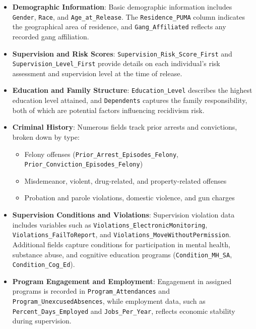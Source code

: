 \documentclass[12pt]{article}
\begin{document}
\begin{itemize}
    \item \textbf{Demographic Information}: Basic demographic information includes \texttt{Gender}, \texttt{Race}, and \texttt{Age\_at\_Release}. The \texttt{Residence\_PUMA} column indicates the geographical area of residence, and \texttt{Gang\_Affiliated} reflects any recorded gang affiliation.
    
    \item \textbf{Supervision and Risk Scores}: \texttt{Supervision\_Risk\_Score\_First} and \texttt{Supervision\_Level\_First} provide details on each individual’s risk assessment and supervision level at the time of release.
    
    \item \textbf{Education and Family Structure}: \texttt{Education\_Level} describes the highest education level attained, and \texttt{Dependents} captures the family responsibility, both of which are potential factors influencing recidivism risk.
    
    \item \textbf{Criminal History}: Numerous fields track prior arrests and convictions, broken down by type:
    \begin{itemize}
        \item Felony offenses (\texttt{Prior\_Arrest\_Episodes\_Felony}, \texttt{Prior\_Conviction\_Episodes\_Felony})
        \item Misdemeanor, violent, drug-related, and property-related offenses
        \item Probation and parole violations, domestic violence, and gun charges
    \end{itemize}
    
    \item \textbf{Supervision Conditions and Violations}: Supervision violation data includes variables such as \texttt{Violations\_ElectronicMonitoring}, \texttt{Violations\_FailToReport}, and \texttt{Violations\_MoveWithoutPermission}. Additional fields capture conditions for participation in mental health, substance abuse, and cognitive education programs (\texttt{Condition\_MH\_SA}, \texttt{Condition\_Cog\_Ed}).
    
    \item \textbf{Program Engagement and Employment}: Engagement in assigned programs is recorded in \texttt{Program\_Attendances} and \texttt{Program\_UnexcusedAbsences}, while employment data, such as \texttt{Percent\_Days\_Employed} and \texttt{Jobs\_Per\_Year}, reflects economic stability during supervision.
    

\end{itemize}
\end{document}
